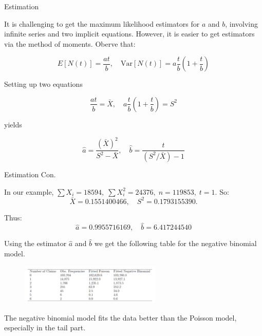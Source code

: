 \documentclass{beamer}
\begin{document}
\begin{frame}{Estimation}

    {\footnotesize \footnotesize
    \par  It is challenging to get the maximum likelihood estimators for \(a\) and \(b\), involving infinite series 
    and two implicit equations. However, it is easier to get estimators via the method of moments. Oberve that:

    \[
    E\left[N(t)\right]=\frac{at}{b},\quad \text{Var}\left[N(t)\right]=a\frac{t}{b}\left(1+ \frac{t}{b}\right)
    \]

    \par Setting up two equations

    \[
    \frac{at}{b}=\bar{X},\quad a\frac{t}{b}\left(1+\frac{t}{b}\right)=S^{2}
    \]

    \par yields

    \[
    \hat{a}=\frac{(\bar{X})^{2}}{S^{2}-\bar{X}},\quad \hat{b}=\frac{t}{(S^{2}/\bar{X})-1}
    \]

    }
    
\end{frame}

\begin{frame}{Estimation Con.}

    {\footnotesize \footnotesize
    \par In our example, $\sum X_{i}=18594,\;\sum X_{i}^{2}=24376,\; n=119853,\;t=1.$ So:
    \[
    \bar{X}=0.1551400466,\quad S^{2}=0.1793155390.
    \]
    \par Thus:
    \[
    \hat{a}=0.9955716169,\quad \hat{b}=6.417244540
    \]
    \par Using the estimator \(\hat{a}\) and \(\hat{b}\) we get the following table for the negative binomial model.
    \begin{figure}
    \centering
    \includegraphics[width=0.6\textwidth]{2025-09-08_1}
    \end{figure}
    \par The negative binomial model fits the data better than the Poisson model,
    especially in the tail part.
    }
    
\end{frame}
\end{document}
